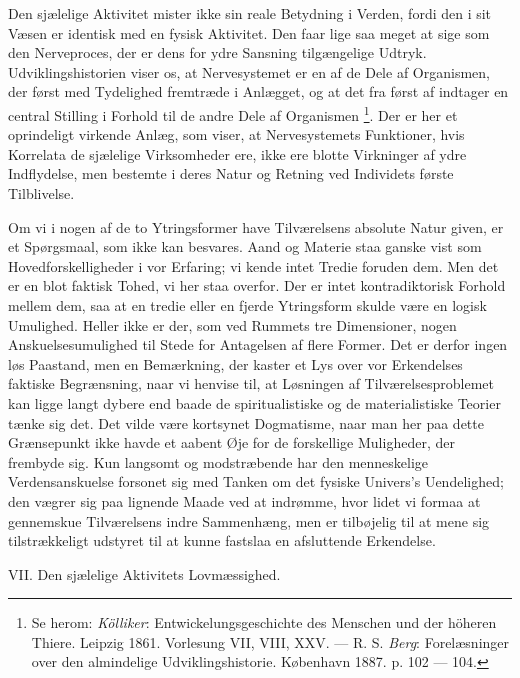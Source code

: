 \documentclass[12pt,a4paper,openany]{book}
\newcommand{\opage}[1]{\marginnote{\footnotesize\textit{[#1]}}}
\begin{document}
Den sjælelige Aktivitet mister ikke sin reale Betydning i Verden, fordi den i
sit Væsen er identisk med en fysisk Aktivitet. Den faar lige saa meget at sige
som den Nerveproces, der er dens for ydre Sansning tilgængelige Udtryk.
Udviklingshistorien viser os, at Nervesystemet er en af de Dele af Organismen,
der først med Tydelighed fremtræde i Anlægget, og at det fra først af indtager
en central Stilling i Forhold til de andre Dele af Organismen%
\footnote[1]{Se herom: \emph{Kölliker}: Entwickelungsgeschichte des Menschen
und der höheren Thiere. Leipzig 1861. Vorlesung VII, VIII, XXV. --- R. S.
\emph{Berg}: Forelæsninger over den almindelige Udviklingshistorie. København
1887. p. 102 --- 104.}. Der er her et oprindeligt virkende Anlæg, som viser, at
Nervesystemets Funktioner, hvis Korrelata de sjælelige Virksomheder ere, ikke
ere blotte Virkninger af ydre Indflydelse, men bestemte i deres Natur og
Retning ved Individets første Tilblivelse.

Om vi i nogen af de to Ytringsformer have Tilværelsens absolute Natur given, er
et Spørgsmaal, som ikke kan besvares. Aand og Materie staa ganske vist som
Hovedforskelligheder i vor Erfaring; vi kende intet Tredie foruden dem. Men det
er en blot faktisk Tohed, vi her staa overfor. Der er intet kontradiktorisk
Forhold mellem dem, saa at en tredie eller en fjerde Ytringsform skulde være en
logisk Umulighed. Heller ikke er der, som ved Rummets tre Dimensioner, nogen
Anskuelsesumulighed til Stede for Antagelsen af
\setcounter{footnote}{0}%
\opage{92}flere Former. Det er derfor ingen løs Paastand, men en Bemærkning,
der kaster et Lys over vor Erkendelses faktiske Begrænsning, naar vi henvise
til, at Løsningen af Tilværelsesproblemet kan ligge langt dybere end baade de
spiritualistiske og de materialistiske Teorier tænke sig det. Det vilde være
kortsynet Dogmatisme, naar man her paa dette Grænsepunkt ikke havde et aabent
Øje for de forskellige Muligheder, der frembyde sig. Kun langsomt og
modstræbende har den menneskelige Verdensanskuelse forsonet sig med Tanken om
det fysiske Univers's Uendelighed; den vægrer sig paa lignende Maade ved at
indrømme, hvor lidet vi formaa at gennemskue Tilværelsens indre Sammenhæng, men
er tilbøjelig til at mene sig tilstrækkeligt udstyret til at kunne fastslaa en
afsluttende Erkendelse.

\begin{center}\large VII. Den sjælelige Aktivitets Lovmæssighed.\end{center}
\end{document}
